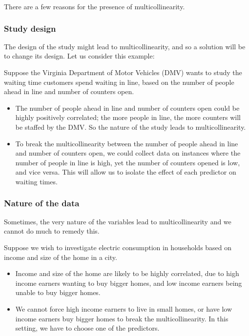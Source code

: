 \documentclass[
]{book}
\begin{document}
There are a few reasons for the presence of multicollinearity.

\hypertarget{study-design}{%
\subsubsection{Study design}\label{study-design}}

The design of the study might lead to multicollinearity, and so a solution will be to change its design. Let us consider this example:

Suppose the Virginia Department of Motor Vehicles (DMV) wants to study the waiting time customers spend waiting in line, based on the number of people ahead in line and number of counters open.

\begin{itemize}
\item
  The number of people ahead in line and number of counters open could be highly positively correlated; the more people in line, the more counters will be staffed by the DMV. So the nature of the study leads to multicollinearity.
\item
  To break the multicollinearity between the number of people ahead in line and number of counters open, we could collect data on instances where the number of people in line is high, yet the number of counters opened is low, and vice versa. This will allow us to isolate the effect of each predictor on waiting times.
\end{itemize}

\hypertarget{nature-of-the-data}{%
\subsubsection{Nature of the data}\label{nature-of-the-data}}

Sometimes, the very nature of the variables lead to multicollinearity and we cannot do much to remedy this.

Suppose we wish to investigate electric consumption in households based on income and size of the home in a city.

\begin{itemize}
\item
  Income and size of the home are likely to be highly correlated, due to high income earners wanting to buy bigger homes, and low income earners being unable to buy bigger homes.
\item
  We cannot force high income earners to live in small homes, or have low income earners buy bigger homes to break the multicollinearity. In this setting, we have to choose one of the predictors.
\end{itemize}
\end{document}
